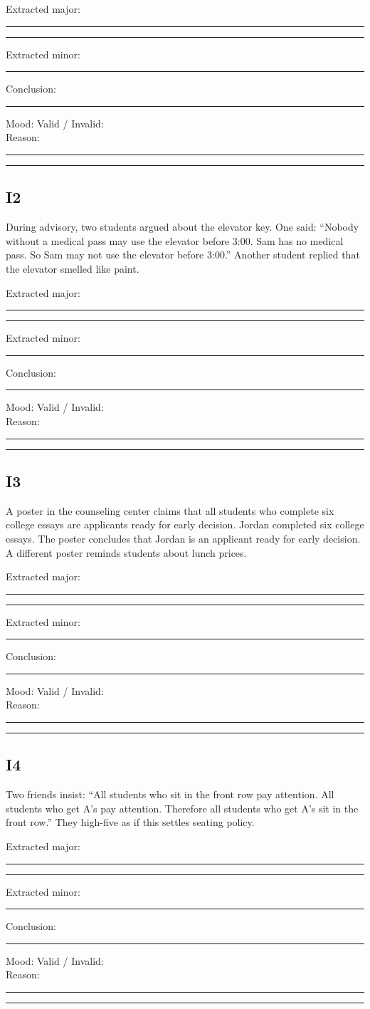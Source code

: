 \documentclass[11pt]{article}
\newcommand{\ansline}{\par\vspace{0.15em}\noindent\rule{\linewidth}{0.4pt}\par\vspace{0.08em}}
\newcommand{\twolines}{\ansline\ansline}
\begin{document}
Extracted major: \twolines
Extracted minor: \ansline
Conclusion: \ansline
Mood: \underline{\hspace{1.0in}} \quad Valid / Invalid: \underline{\hspace{1.2in}}\\
Reason: \twolines

\subsection*{I2}
During advisory, two students argued about the elevator key. One said: ``Nobody without a medical pass may use the elevator before 3:00. Sam has no medical pass. So Sam may not use the elevator before 3:00.'' Another student replied that the elevator smelled like paint.

Extracted major: \twolines
Extracted minor: \ansline
Conclusion: \ansline
Mood: \underline{\hspace{1.0in}} \quad Valid / Invalid: \underline{\hspace{1.2in}}\\
Reason: \twolines

\subsection*{I3}
A poster in the counseling center claims that all students who complete six college essays are applicants ready for early decision. Jordan completed six college essays. The poster concludes that Jordan is an applicant ready for early decision. A different poster reminds students about lunch prices.

Extracted major: \twolines
Extracted minor: \ansline
Conclusion: \ansline
Mood: \underline{\hspace{1.0in}} \quad Valid / Invalid: \underline{\hspace{1.2in}}\\
Reason: \twolines

\subsection*{I4}
Two friends insist: ``All students who sit in the front row pay attention. All students who get A's pay attention. Therefore all students who get A's sit in the front row.'' They high-five as if this settles seating policy.

Extracted major: \twolines
Extracted minor: \ansline
Conclusion: \ansline
Mood: \underline{\hspace{1.0in}} \quad Valid / Invalid: \underline{\hspace{1.2in}}\\
Reason: \twolines
\end{document}
